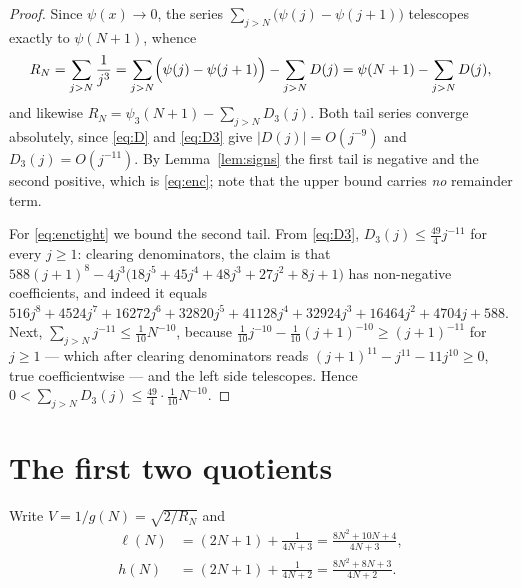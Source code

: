 \documentclass[11pt]{amsart}
\theoremstyle{definition}
\theoremstyle{remark}
\newcommand{\Rt}{R}
\newcommand{\ps}{\psi}
\newcommand{\pss}{\psi_3}
\begin{document}
\begin{proof}
Since $\ps(x)\to0$, the series $\sum_{j>N}\bigl(\ps(j)-\ps(j+1)\bigr)$
telescopes exactly to $\ps(N+1)$, whence
\[
 \Rt_N=\sum_{j>N}\frac1{j^3}
      =\sum_{j>N}\Bigl(\ps(j)-\ps(j+1)\Bigr)-\sum_{j>N}D(j)
      =\ps(N+1)-\sum_{j>N}D(j),
\]
and likewise $\Rt_N=\pss(N+1)-\sum_{j>N}D_3(j)$. Both tail series converge
absolutely, since \eqref{eq:D} and \eqref{eq:D3} give
$|D(j)|=O(j^{-9})$ and $D_3(j)=O(j^{-11})$. By Lemma~\ref{lem:signs} the
first tail is negative and the second positive, which is \eqref{eq:enc}; note
that the upper bound carries \emph{no} remainder term.

For \eqref{eq:enctight} we bound the second tail. From \eqref{eq:D3},
$D_3(j)\le \tfrac{49}{4}j^{-11}$ for every $j\ge1$: clearing denominators, the
claim is that $588(j+1)^8-4j^3\bigl(18j^5+45j^4+48j^3+27j^2+8j+1\bigr)$ has
non-negative coefficients, and indeed it equals
$516j^8+4524j^7+16272j^6+32820j^5+41128j^4+32924j^3+16464j^2+4704j+588$. Next,
$\sum_{j>N}j^{-11}\le\tfrac1{10}N^{-10}$, because
$\tfrac1{10}j^{-10}-\tfrac1{10}(j+1)^{-10}\ge(j+1)^{-11}$ for $j\ge1$ --- which
after clearing denominators reads
$(j+1)^{11}-j^{11}-11j^{10}\ge0$, true coefficientwise --- and the left side
telescopes. Hence $0<\sum_{j>N}D_3(j)\le\tfrac{49}{4}\cdot\tfrac1{10}N^{-10}$.
\end{proof}

\section{The first two quotients}\label{sec:a12}

Write $V=1/g(N)=\sqrt{2/\Rt_N}$ and
\begin{equation}\label{eq:lohi}
\begin{aligned}
 \ell(N)&=(2N+1)+\frac1{4N+3}=\frac{8N^2+10N+4}{4N+3},\\
 h(N)&=(2N+1)+\frac1{4N+2}=\frac{8N^2+8N+3}{4N+2}.
\end{aligned}
\end{equation}
\end{document}
